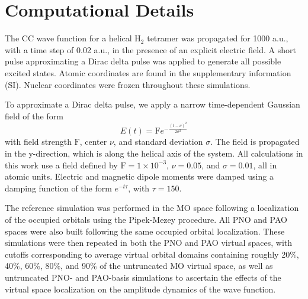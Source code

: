 \section{Computational Details} \label{se:comp}
The CC wave function for a helical H$_2$ tetramer was propagated
for 1000 a.u., with a time step of 0.02 a.u., in the presence of an explicit electric field. A short pulse
approximating a Dirac delta pulse was applied to generate all possible excited states. Atomic coordinates
are found in the supplementary information (SI). Nuclear coordinates were frozen throughout
these simulations.

To approximate a Dirac delta pulse, we apply a narrow time-dependent Gaussian field 
of the form
\begin{equation}
    E(t) = \textrm{F}e^{-\frac{(t-\nu)^{2}}{2\sigma^2}}
\end{equation}
with field strength $\textrm{F}$, center $\nu$, and standard deviation $\sigma$.
The field is propagated in the y-direction, which is along the helical axis of the system.
All calculations in this work use a field defined by $\textrm{F} = 1\times 10^{-3}$,
$\nu = 0.05$, and $\sigma = 0.01$, all in atomic units. Electric and magnetic 
dipole moments were damped using a damping function of the form $e^{-t\tau}$, 
with $\tau = 150$.

The reference simulation was performed in the MO space following a localization of the occupied
orbitals using the Pipek-Mezey procedure.\cite{Pipek1989} All PNO and PAO spaces were also 
built following the same occupied orbital localization. These simulations
were then repeated in both the PNO and PAO virtual spaces, with cutoffs
corresponding to average virtual orbital domains containing roughly 20\%, 40\%, 60\%,
80\%, and 90\% of the untruncated MO virtual space, as well as untruncated PNO- and PAO-basis
simulations to ascertain the effects of the virtual space localization on
the amplitude dynamics of the wave function. 

